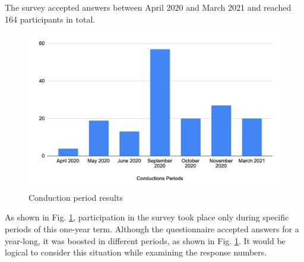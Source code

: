 The survey accepted answers between April 2020 and March 2021 and reached 164 participants in total.
\begin{figure}[ht!]
    \centering
    \includegraphics[scale=0.28]{figures/survey_conduction_period.png}
    \caption{Conduction period results}
    \label{fig:conduction_period}
\end{figure}
\FloatBarrier

As shown in Fig. \ref{fig:conduction_period}, participation in the survey took place only during specific periods of this one-year term. Although the questionnaire accepted answers for a year-long, it was boosted in different periods,  as shown in Fig. \ref{fig:conduction_period}. It would be logical to consider this situation while examining the response numbers.